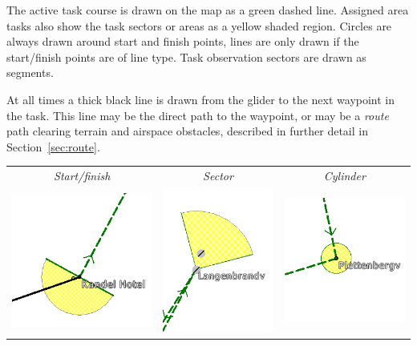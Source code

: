 The active task course is drawn on the map as a green dashed line.
Assigned area tasks also show the task sectors or areas as a yellow shaded
region.  
Circles are always drawn around start and finish points, lines are
only drawn if the start/finish points are of line type.  Task
observation sectors are drawn as segments.

At all times a thick black line is drawn from the glider to the next
waypoint in the task.  This line may be the direct path to the waypoint,
or may be a {\em route} path clearing terrain and airspace obstacles, described in
further detail in Section~\ref{sec:route}.

\begin{center}

\begin{tabular}{c c c}
{\it Start/finish} & {\it Sector} & {\it Cylinder} \\
\includegraphics[angle=0,width=0.3\linewidth,keepaspectratio='true']{figures/cut-startfinish.png} &
\includegraphics[angle=0,width=0.3\linewidth,keepaspectratio='true']{figures/cut-sector.png} &
\includegraphics[angle=0,width=0.3\linewidth,keepaspectratio='true']{figures/cut-barrel.png} \\
\end{tabular}
\end{center}

